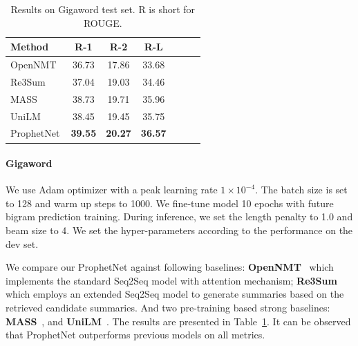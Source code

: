 \documentclass[11pt,a4paper]{article}
\begin{document}
\begin{table}[th] 
\small
\begin{center}
  \begin{tabular}{lcccccl} 
    \toprule
    Method & R-1 & R-2 & R-L \\
    \midrule
 OpenNMT~\cite{klein2017opennmt} & 36.73 & 17.86 & 33.68 \\
Re3Sum~\cite{cao2018retrieve} & 37.04 & 19.03 & 34.46 \\
MASS~\cite{song2019mass} & 38.73 & 19.71 & 35.96 \\
 UniLM~\cite{dong2019unified} & 38.45  & 19.45 &   35.75\\
 \hline
 ProphetNet &   \textbf{39.55}  & \textbf{20.27}   & \textbf{36.57}\\
  \bottomrule
\end{tabular}
\end{center}
\caption{Results on Gigaword test set. R is short for ROUGE.}\label{tab:gigaword}
\end{table}

\paragraph{Gigaword} 
We use Adam optimizer with a peak learning rate $1 \times 10^{-4}$.
The batch size is set to 128 and warm up steps to 1000. We fine-tune model 10 epochs with future bigram prediction training.
During inference, we set the length penalty to 1.0 and beam size to 4. We set the hyper-parameters according to the performance on the dev set.

We compare our ProphetNet against following baselines:
\textbf{OpenNMT}~\cite{klein2017opennmt} which implements the standard Seq2Seq model with attention mechanism;
\textbf{Re3Sum}~\cite{cao2018retrieve} which employs an extended Seq2Seq model to generate summaries based on the retrieved candidate summaries.
And two pre-training based strong baselines:  \textbf{MASS}~\cite{song2019mass}, and \textbf{UniLM}~\cite{dong2019unified}.
The results are presented in Table~\ref{tab:gigaword}.
It can be observed that ProphetNet outperforms previous models on all metrics.
\end{document}
